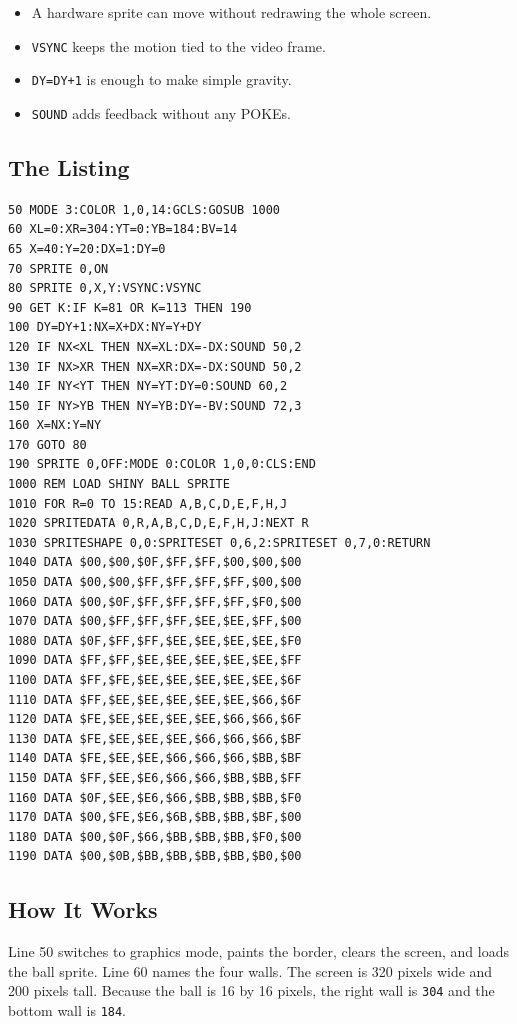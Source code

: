 \begin{learnbox}
\begin{itemize}
\item A hardware sprite can move without redrawing the whole screen.
\item \texttt{VSYNC} keeps the motion tied to the video frame.
\item \texttt{DY=DY+1} is enough to make simple gravity.
\item \texttt{SOUND} adds feedback without any POKEs.
\end{itemize}
\end{learnbox}

\subsection*{The Listing}

\begin{lstlisting}
50 MODE 3:COLOR 1,0,14:GCLS:GOSUB 1000
60 XL=0:XR=304:YT=0:YB=184:BV=14
65 X=40:Y=20:DX=1:DY=0
70 SPRITE 0,ON
80 SPRITE 0,X,Y:VSYNC:VSYNC
90 GET K:IF K=81 OR K=113 THEN 190
100 DY=DY+1:NX=X+DX:NY=Y+DY
120 IF NX<XL THEN NX=XL:DX=-DX:SOUND 50,2
130 IF NX>XR THEN NX=XR:DX=-DX:SOUND 50,2
140 IF NY<YT THEN NY=YT:DY=0:SOUND 60,2
150 IF NY>YB THEN NY=YB:DY=-BV:SOUND 72,3
160 X=NX:Y=NY
170 GOTO 80
190 SPRITE 0,OFF:MODE 0:COLOR 1,0,0:CLS:END
1000 REM LOAD SHINY BALL SPRITE
1010 FOR R=0 TO 15:READ A,B,C,D,E,F,H,J
1020 SPRITEDATA 0,R,A,B,C,D,E,F,H,J:NEXT R
1030 SPRITESHAPE 0,0:SPRITESET 0,6,2:SPRITESET 0,7,0:RETURN
1040 DATA $00,$00,$0F,$FF,$FF,$00,$00,$00
1050 DATA $00,$00,$FF,$FF,$FF,$FF,$00,$00
1060 DATA $00,$0F,$FF,$FF,$FF,$FF,$F0,$00
1070 DATA $00,$FF,$FF,$FF,$EE,$EE,$FF,$00
1080 DATA $0F,$FF,$FF,$EE,$EE,$EE,$EE,$F0
1090 DATA $FF,$FF,$EE,$EE,$EE,$EE,$EE,$FF
1100 DATA $FF,$FE,$EE,$EE,$EE,$EE,$EE,$6F
1110 DATA $FF,$EE,$EE,$EE,$EE,$EE,$66,$6F
1120 DATA $FE,$EE,$EE,$EE,$EE,$66,$66,$6F
1130 DATA $FE,$EE,$EE,$EE,$66,$66,$66,$BF
1140 DATA $FE,$EE,$EE,$66,$66,$66,$BB,$BF
1150 DATA $FF,$EE,$E6,$66,$66,$BB,$BB,$FF
1160 DATA $0F,$EE,$E6,$66,$BB,$BB,$BB,$F0
1170 DATA $00,$FE,$E6,$6B,$BB,$BB,$BF,$00
1180 DATA $00,$0F,$66,$BB,$BB,$BB,$F0,$00
1190 DATA $00,$0B,$BB,$BB,$BB,$BB,$B0,$00
\end{lstlisting}

\subsection*{How It Works}

Line 50 switches to graphics mode, paints the border, clears the screen, and
loads the ball sprite. Line 60 names the four walls. The screen is 320 pixels
wide and 200 pixels tall. Because the ball is 16 by 16 pixels, the right wall
is \texttt{304} and the bottom wall is \texttt{184}.

